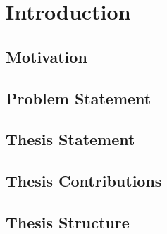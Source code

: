 \chapter{Introduction}
\label{chap:intro}
\section{Motivation}

\section{Problem Statement}

\section{Thesis Statement}

\section{Thesis Contributions}

\section{Thesis Structure}
